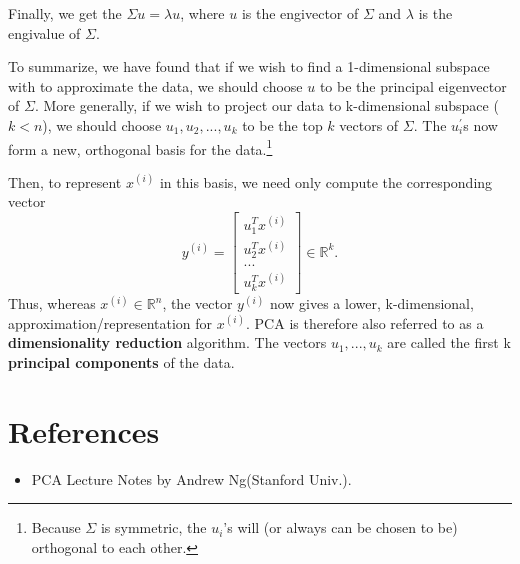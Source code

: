 \documentclass[a4paper]{article}
\begin{document}
Finally, we get the $\Sigma u = \lambda u$, where $u$ is the engivector of $\Sigma$ and $\lambda$ is the engivalue of  $\Sigma$.

To summarize, we have found that if we wish to find a 1-dimensional subspace with to approximate the data, we should choose $u$ to be the principal eigenvector of $\Sigma$. More generally, if we wish to project our data to k-dimensional subspace ($k<n$), we should choose $u_1, u_2, ..., u_k$ to be the top $k$ vectors of $\Sigma$. The $u_i^{'}$s now form a new, orthogonal basis for the data.\footnote{Because $\Sigma$ is symmetric, the $u_i$'s will (or always can be chosen to be) orthogonal to each other.}

Then, to represent $x^{(i)}$ in this basis, we need only compute the corresponding vector
$$
	y^{(i)} = \begin{bmatrix} 
	u_1^Tx^{(i)} \\
	u_2^Tx^{(i)} \\
	... \\
	u_k^Tx^{(i)} \end{bmatrix}
	\in \mathbb{R}^{k}.
$$
Thus, whereas $x^{(i)} \in \mathbb{R}^n$, the vector $y^{(i)}$ now gives a lower, k-dimensional, approximation/representation for $x^{(i)}$. PCA is therefore also referred to as a \textbf{dimensionality reduction} algorithm. The vectors $u_1, ..., u_k$ are called the first k \textbf{principal components} of the data.

\section{References}

\begin{itemize}
    \item PCA Lecture Notes by Andrew Ng(Stanford Univ.).    
\end{itemize}
\end{document}
